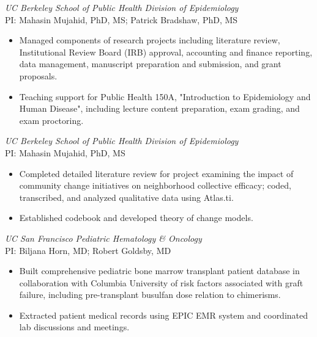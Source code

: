 \documentclass{cv_style}
\begin{document}
\textit{UC Berkeley School of Public Health Division of Epidemiology} \\
PI: Mahasin Mujahid, PhD, MS; Patrick Bradshaw, PhD, MS
\begin{itemize}
    \item Managed components of research projects including literature review, Institutional Review Board (IRB) approval, accounting and finance reporting, data management, manuscript preparation and submission, and grant proposals.
    \item \parskip 1pt Teaching support for Public Health 150A, "Introduction to Epidemiology and Human Disease", including lecture content preparation, exam grading, and exam proctoring.
\end{itemize}

\textit{UC Berkeley School of Public Health Division of Epidemiology} \\
PI: Mahasin Mujahid, PhD, MS
\begin{itemize}
    \item Completed detailed literature review for project examining the impact of community change initiatives on neighborhood collective efficacy; coded, transcribed, and analyzed qualitative data using Atlas.ti.
    \item \parskip 1pt Established codebook and developed theory of change models.
\end{itemize}

\textit{UC San Francisco Pediatric Hematology \& Oncology} \\
PI: Biljana Horn, MD; Robert Goldsby, MD
\begin{itemize}
    \item Built comprehensive pediatric bone marrow transplant patient database in collaboration with Columbia University of risk factors associated with graft failure, including pre-transplant busulfan dose relation to chimerisms.
    \item \parskip 1pt Extracted patient medical records using EPIC EMR system and coordinated lab discussions and meetings.
\end{itemize}
\end{document}
